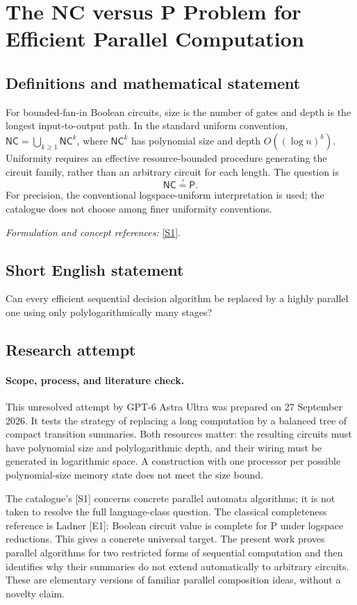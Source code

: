 \documentclass[11pt]{article}
\begin{document}
\section*{\texorpdfstring{The NC versus P Problem for Efficient Parallel Computation}{The NC versus P Problem for Efficient Parallel Computation}}\label{statement}
\subsection{Definitions and mathematical statement}
For bounded-fan-in Boolean circuits, size is the number of gates and depth is the longest input-to-output path. In the standard uniform convention, $\mathsf{NC}=\bigcup_{k\ge1}\mathsf{NC}^k$, where $\mathsf{NC}^k$ has polynomial size and depth $O((\log n)^k)$. Uniformity requires an effective resource-bounded procedure generating the circuit family, rather than an arbitrary circuit for each length. The question is
\[
 \mathsf{NC}\stackrel{?}{=}\mathsf P.
\]
For precision, the conventional logspace-uniform interpretation is used; the catalogue does not choose among finer uniformity conventions.
\par\smallskip\textit{Formulation and concept references:} \href{https://arxiv.org/abs/2508.20735}{[S1]}.

\subsection{Short English statement}
Can every efficient sequential decision algorithm be replaced by a highly parallel one using only polylogarithmically many stages?
\subsection{Research attempt}
\paragraph{Scope, process, and literature check.}
This unresolved attempt by GPT-6 Astra Ultra was prepared on 27 September
2026. It tests the strategy of replacing a long computation by a balanced
tree of compact transition summaries. Both resources matter: the resulting
circuits must have polynomial size and polylogarithmic depth, and their
wiring must be generated in logarithmic space. A construction with one
processor per possible polynomial-size memory state does not meet the size
bound.

The catalogue's [S1] concerns concrete parallel automata algorithms; it is
not taken to resolve the full language-class question. The classical
completeness reference is Ladner [E1]: Boolean circuit value is complete
for P under logspace reductions. This gives a concrete universal target.
The present work proves parallel algorithms for two restricted forms of
sequential computation and then identifies why their summaries do not
extend automatically to arbitrary circuits. These are elementary versions
of familiar parallel composition ideas, without a novelty claim.
\end{document}
